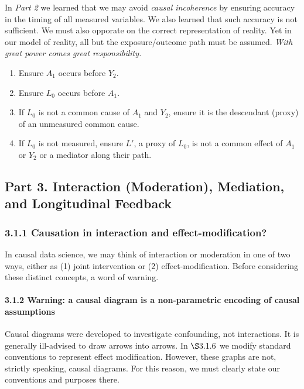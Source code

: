 \documentclass[
  singlecolumn]{article}
\let\oldparagraph\paragraph
\renewcommand{\paragraph}[1]{\oldparagraph{#1}\mbox{}}
\providecommand{\tightlist}{%
  \setlength{\itemsep}{0pt}\setlength{\parskip}{0pt}}\usepackage{longtable,booktabs,array}
\begin{document}
In \emph{Part 2} we learned that we may avoid \emph{causal incoherence}
by ensuring accuracy in the timing of all measured variables. We also
learned that such accuracy is not sufficient. We must also opporate on
the correct representation of reality. Yet in our model of reality, all
but the exposure/outcome path must be assumed. \emph{With great power
comes great responsibility.}

\begin{enumerate}
\def\labelenumi{\arabic{enumi}.}
\tightlist
\item
  Ensure \(A_1\) occurs before \(Y_2\).
\item
  Ensure \(L_0\) occurs before \(A_1\).
\item
  If \(L_0\) is not a common cause of \(A_1\) and \(Y_2\), ensure it is
  the descendant (proxy) of an unmeasured common cause.
\item
  If \(L_0\) is not measured, ensure \(L'\), a proxy of \(L_0\), is not
  a common effect of \(A_1\) or \(Y_2\) or a mediator along their path.
\end{enumerate}

\subsection{Part 3. Interaction (Moderation), Mediation, and
Longitudinal
Feedback}\label{part-3.-interaction-moderation-mediation-and-longitudinal-feedback}

\subsubsection{3.1.1 Causation in interaction and
effect-modification?}\label{causation-in-interaction-and-effect-modification}

In causal data science, we may think of interaction or moderation in one
of two ways, either as (1) joint intervention or (2)
effect-modification. Before considering these distinct concepts, a word
of warning.

\paragraph{3.1.2 Warning: a causal diagram is a non-parametric encoding
of causal
assumptions}\label{warning-a-causal-diagram-is-a-non-parametric-encoding-of-causal-assumptions}

Causal diagrams were developed to investigate confounding, not
interactions. It is generally ill-advised to draw arrows into arrows. In
\(\S 3.1.6\) we modify standard conventions to represent effect
modification. However, these graphs are not, strictly speaking, causal
diagrams. For this reason, we must clearly state our conventions and
purposes there.
\end{document}
